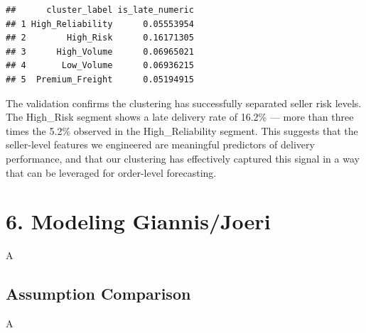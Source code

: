 \documentclass[
]{article}
\newenvironment{Shaded}{\begin{snugshade}}{\end{snugshade}}
\newcommand{\AttributeTok}[1]{\textcolor[rgb]{0.13,0.29,0.53}{#1}}
\newcommand{\CommentTok}[1]{\textcolor[rgb]{0.56,0.35,0.01}{\textit{#1}}}
\newcommand{\FunctionTok}[1]{\textcolor[rgb]{0.13,0.29,0.53}{\textbf{#1}}}
\newcommand{\NormalTok}[1]{#1}
\newcommand{\OtherTok}[1]{\textcolor[rgb]{0.56,0.35,0.01}{#1}}
\newcommand{\SpecialCharTok}[1]{\textcolor[rgb]{0.81,0.36,0.00}{\textbf{#1}}}
\newcommand{\StringTok}[1]{\textcolor[rgb]{0.31,0.60,0.02}{#1}}
\begin{document}
\begin{Shaded}
\end{Shaded}

\begin{verbatim}
##      cluster_label is_late_numeric
## 1 High_Reliability      0.05553954
## 2        High_Risk      0.16171305
## 3      High_Volume      0.06965021
## 4       Low_Volume      0.06936215
## 5  Premium_Freight      0.05194915
\end{verbatim}

The validation confirms the clustering has successfully separated seller
risk levels. The High\_Risk segment shows a late delivery rate of 16.2\%
--- more than three times the 5.2\% observed in the High\_Reliability
segment. This suggests that the seller-level features we engineered are
meaningful predictors of delivery performance, and that our clustering
has effectively captured this signal in a way that can be leveraged for
order-level forecasting.

\section{6. Modeling Giannis/Joeri}\label{modeling-giannisjoeri}

A

\subsection{Assumption Comparison}\label{assumption-comparison}

A
\end{document}
